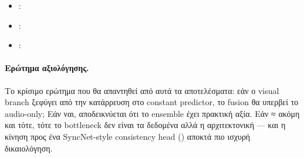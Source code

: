\begin{itemize}
  \item {}: 
  \item {}:    
  \item {}:   
\end{itemize}

\paragraph{Ερώτημα αξιολόγησης.}
Το κρίσιμο ερώτημα που θα απαντηθεί από αυτά τα αποτελέσματα:
εάν ο visual branch ξεφύγει από την κατάρρευση στο constant predictor,
το fusion θα υπερβεί το audio-only;
Εάν ναι, αποδεικνύεται ότι το ensemble έχει πρακτική αξία.
Εάν  ≈  ακόμη και τότε,
τότε το bottleneck δεν είναι τα δεδομένα αλλά η αρχιτεκτονική —
και η κίνηση προς ένα SyncNet-style consistency head
() αποκτά πιο ισχυρή δικαιολόγηση.
